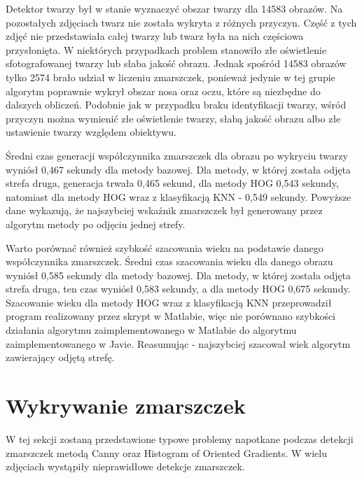 \documentclass[a4paper,twoside,12pt]{book}
\begin{document}
    Detektor twarzy był w stanie wyznaczyć obszar twarzy dla 14583 obrazów.
    Na pozostałych zdjęciach twarz nie została wykryta z różnych przyczyn. Część z tych zdjęć nie przedstawiała całej
    twarzy lub twarz była na nich częściowa przysłonięta. W niektórych przypadkach problem stanowiło złe oświetlenie
    sfotografowanej twarzy lub słaba jakość obrazu.
    Jednak spośród 14583 obrazów tylko 2574 brało udział w liczeniu zmarszczek, ponieważ jedynie w tej grupie algorytm
    poprawnie wykrył obszar nosa oraz oczu, które są niezbędne do dalszych obliczeń. Podobnie jak w przypadku braku
    identyfikacji twarzy, wśród przyczyn można wymienić złe oświetlenie twarzy, słabą jakość obrazu albo złe
    ustawienie twarzy względem obiektywu.

    Średni czas generacji współczynnika zmarszczek dla obrazu po wykryciu twarzy wyniósł 0,467 sekundy dla metody
    bazowej.
    Dla metody, w której została odjęta strefa druga, generacja trwała 0,465 sekund,
    dla metody HOG 0,543 sekundy, natomiast dla metody HOG wraz z klasyfikacją KNN - 0,549 sekundy.
    Powyższe dane wykazują, że najszybciej wskaźnik zmarszczek był generowany przez algorytm metody
    po odjęciu jednej strefy.

    Warto porównać również szybkość szacowania wieku na podstawie danego współczynnika zmarszczek.
    Średni czas szacowania wieku dla danego obrazu wyniósł 0,585 sekundy dla metody bazowej.
    Dla metody, w której została
    odjęta strefa druga, ten czas wyniósł 0,583 sekundy, a dla metody HOG 0,675 sekundy.
    Szacowanie wieku dla metody HOG wraz z klasyfikacją KNN przeprowadził
    program realizowany przez skrypt w Matlabie, więc nie porównano szybkości działania
    algorytmu zaimplementowanego w Matlabie do algorytmu zaimplementowanego w Javie.
    Reasumując - najszybciej szacował wiek algorytm zawierający odjętą strefę.


    \section{Wykrywanie zmarszczek}\label{sec:wykrywanie-krawędzi-przez-detektor-canny}
    W tej sekcji zostaną przedstawione typowe problemy napotkane podczas detekcji zmarszczek metodą Canny oraz Histogram
    of Oriented Gradients.
    W wielu zdjęciach wystąpiły nieprawidłowe detekcje zmarszczek.
\end{document}
